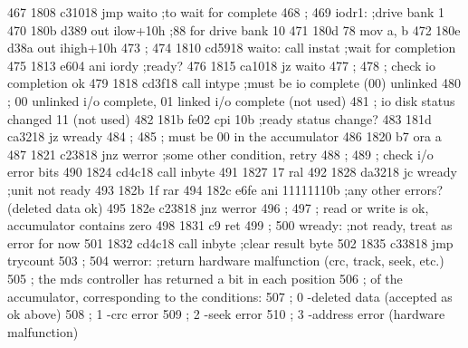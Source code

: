 467      1808 c31018               jmp      waito            ;to wait for complete
468                       ;
469                       iodr1:   ;drive bank 1
470      180b d389                 out      ilow+10h         ;88 for drive bank 10
471      180d 78                   mov      a, b
472      180e d38a                 out      ihigh+10h
473                       ;
474      1810 cd5918      waito:   call     instat           ;wait for completion
475      1813 e604                 ani      iordy            ;ready?
476      1815 ca1018               jz       waito
477                       ;
478                       ;        check io completion ok
479      1818 cd3f18               call     intype           ;must be io complete (00) unlinked
480                       ;        00 unlinked i/o complete, 01 linked i/o complete (not used)
481                       ;        io disk status changed    11 (not used)
482      181b fe02                 cpi      10b              ;ready status change?
483      181d ca3218               jz       wready
484                       ;
485                       ;        must be 00 in the accumulator
486      1820 b7                   ora      a
487      1821 c23818               jnz      werror           ;some other condition, retry
488                       ;
489                       ;        check i/o error bits
490      1824 cd4c18               call     inbyte
491      1827 17                   ral
492      1828 da3218               jc       wready           ;unit not ready
493      182b 1f                   rar
494      182c e6fe                 ani      11111110b        ;any other errors? (deleted data ok)
495      182e c23818               jnz      werror
496                       ;
497                       ;        read or write is ok, accumulator contains zero
498      1831 c9                   ret
499                       ;
500                       wready:  ;not ready, treat as error for now
501      1832 cd4c18               call     inbyte           ;clear result byte
502      1835 c33818               jmp      trycount
503                       ;
504                       werror:  ;return hardware malfunction (crc, track, seek, etc.)
505                       ;        the mds controller has returned a bit in each position
506                       ;        of the accumulator, corresponding to the conditions:
507                       ;        0        -deleted data (accepted as ok above)
508                       ;        1        -crc error
509                       ;        2        -seek error
510                       ;        3        -address error (hardware malfunction)
